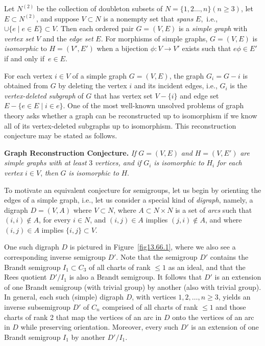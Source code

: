 \documentclass{surv-l}
\numberwithin{equation}{section}
\numberwithin{table}{section}
\numberwithin{figure}{section}
\theoremstyle{plain}
\theoremstyle{definition}
\begin{document}
Let $N^{(2)}$ be the collection of doubleton subsets of
$N=\{1,2\ldots, n\} (n\geq 3)$, let $E\subset N^{(2)}$, and
suppose $V \subset N$ is a nonempty set that \emph{spans}
$E$,~i.e., $\cup\{e \mid e\in E\}\subset V$. Then each ordered
pair $G=(V, E)$ is a \emph{simple graph} with \emph{vertex
set} $V$ and the \emph{edge set} $E$. For
morphisms of simple graphs, $G=(V, E)$ is \emph{isomorphic} to
$H=(V', E')$ when a bijection $\phi : V\rightarrow V'$ exists such
that $e\phi\in E'$ if and only if~$e\in E$.

For each vertex $i\in V$ of a simple graph $G=(V, E)$, the graph
$G_{i}=G-i$ is obtained from $G$ by deleting the vertex $i$ and
its incident edges, i.e., $G_{i}$ is the \emph{vertex-deleted
subgraph} of $G$ that has vertex
set $V-\{i\}$ and edge set $E-\{e\in E\mid i\in e\}$. One of
the most well-known unsolved problems of graph theory asks whether
a graph can be reconstructed up to
isomorphism if we know all of its vertex-deleted subgraphs up to
isomorphism. This reconstruction conjecture may be stated as follows.

 \textbf{Graph Reconstruction Conjecture.} \emph{If} $G=(V, E)$
\emph{and} $H=(V, E')$ \emph{are simple graphs with at least} 3
\emph{vertices, and if} $G_{i}$ \emph{is isomorphic to} $H_{i}$
\emph{for each vertex} $i\in V$, \emph{then} $G$ \emph{is
isomorphic to} $H$.

To motivate an equivalent conjecture for semigroups, let us begin
by orienting the edges of a simple graph, i.e., let us consider a
special kind of \emph{digraph}, namely, a
digraph $D=(V, A)$ where $V \subset N$, where $A\subset N\times N$
is a set of \emph{arcs} such that $(i, i)\not\in A$, for every
$i\in N$, and $(i,j)\in A$ implies $(j, i)\not\in A$, and where
$(i,j)\in A$ implies $\{i,j\}\subset V$.

One such digraph $D$ is pictured in Figure~\ref{fig13.66.1}, where
we also see a corresponding inverse semigroup $D'$. Note that the
semigroup $D'$ contains the Brandt semigroup
$I_{1}\subset C_{3}$ of all charts of rank $\leq 1$ as an ideal,
and that the Rees quotient $D'/I_{1}$ is also
a Brandt semigroup. It follows that $D'$ is an extension of one
Brandt semigroup (with trivial group) by another (also with
trivial group). In general, each such (simple) digraph $D$, with
vertices $1,2,\ldots,n \geq 3$, yields an inverse subsemigroup
$D'$ of $C_{n}$ comprised of all charts of rank $\leq 1$ and those
charts of rank 2 that map the vertices of an arc in $D$ onto the
vertices of an arc in $D$ while preserving orientation. Moreover,
every such $D'$ is an extension of one Brandt semigroup $I_{1}$ by
another $D'/I_{1}$.
\end{document}
